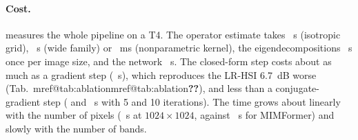 \documentclass[10pt,twocolumn,letterpaper]{article}
\makeatletter
\newcommand{\mref}[1]{\ifcsname mref@#1\endcsname\csname mref@#1\endcsname\else\textbf{??}\fi}
\makeatother
\begin{document}
\paragraph{Cost.}  measures the whole pipeline on a T4. The operator estimate takes ~s (isotropic grid), ~s (wide family) or ~ms (nonparametric kernel), the eigendecompositions ~s once per image size, and the network ~s. The closed-form step costs about as much as a gradient step (~s), which reproduces the LR-HSI 6.7~dB worse (Tab.~\mref{tab:ablation}), and less than a conjugate-gradient step ( and ~s with 5 and 10 iterations). The time grows about linearly with the number of pixels (~s at $1024\times1024$, against ~s for MIMFormer) and slowly with the number of bands.
\end{document}
